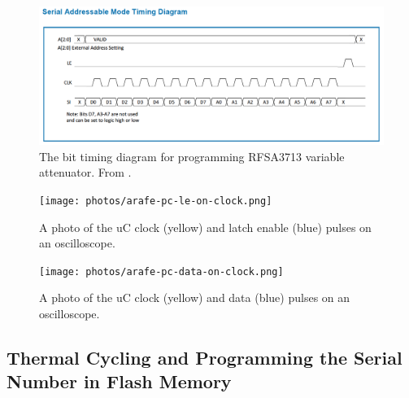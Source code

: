 \documentclass[letter,12pt]{article}
\begin{document}
\begin{figure}
\begin{centering}
\includegraphics[width=\textwidth]{photos/RFSA-command-protocol.png}
\par\end{centering}
\caption{The bit timing diagram for programming RFSA3713 variable attenuator.
From \cite{RFSA}. }
\label{RFSA-timing-diagram}
\end{figure}

\begin{figure}
\begin{centering}
\texttt{[image: photos/arafe-pc-le-on-clock.png]}
\par\end{centering}
\caption{A photo of the uC clock (yellow) and latch enable (blue) pulses on
an oscilloscope.}
\label{clock-and-le}
\end{figure}

\begin{figure}
\begin{centering}
\texttt{[image: photos/arafe-pc-data-on-clock.png]}
\par\end{centering}
\caption{A photo of the uC clock (yellow) and data (blue) pulses on an oscilloscope.}
\label{clock-and-data}
\end{figure}

\subsection{Thermal Cycling and Programming the Serial Number in Flash Memory}
\end{document}
